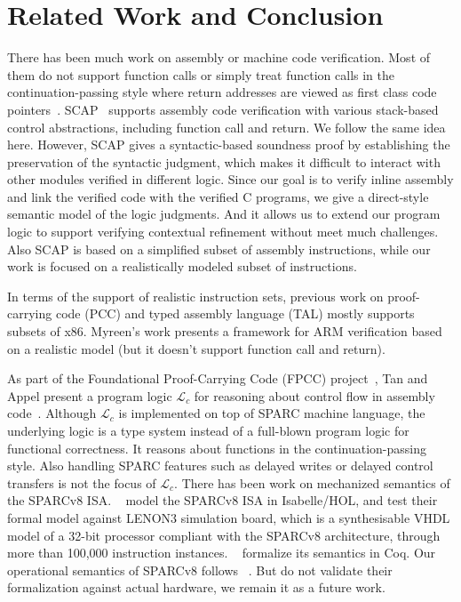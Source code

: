 \section{Related Work and Conclusion}
\label{sec:conclusion}

There has been much work on assembly or
machine code verification. Most of them
do not support function calls or simply
treat function calls in the continuation-passing
style where return addresses are viewed as first
class code pointers~\cite{PCC,FPCC,TAL,TALx86,Yu03ESOP,xcap,cflogic}.
SCAP~\cite{Feng06pldi} supports assembly code verification
with various stack-based control abstractions, including
function call and return. We follow the same idea here.
However, SCAP gives a syntactic-based soundness proof
by establishing the preservation of the syntactic judgment,
which makes it difficult to interact with other modules
verified in different logic. Since our goal is to
verify inline assembly and link the verified code
with the verified C programs, we give a direct-style
semantic model of the logic judgments. And it allows us 
to extend our program logic to support verifying 
contextual refinement without meet much challenges. 
Also SCAP
is based on a simplified subset of assembly instructions,
while our work is focused on a realistically modeled
subset of \sparc{} instructions.

In terms of the support of realistic instruction sets,
previous work on proof-carrying code (PCC) and
typed assembly language (TAL) mostly supports subsets of
x86.
Myreen's work \cite{arm-veri} presents a framework for
ARM verification based on a realistic model
(but it doesn't support function call and return).

As part of the Foundational Proof-Carrying Code (FPCC)
project~\cite{FPCC},
Tan and Appel present a program logic $\mathcal{L}_c$
for reasoning about control flow in assembly code~\cite{cflogic}.
Although $\mathcal{L}_c$ is implemented on top of SPARC machine
language, the underlying logic is a type system instead
of a full-blown program logic for functional correctness.
It reasons about functions in the continuation-passing
style. Also 
handling SPARC features such as delayed writes or delayed
control transfers is not the focus of $\mathcal{L}_c$.
There has been work on mechanized semantics of the SPARCv8 ISA.
~\cite{sparcv8-formalization-Isabelle} model the SPARCv8 ISA
in Isabelle/HOL, and test their formal model against 
LENON3 simulation board, 
which is a synthesisable VHDL model of a 32-bit processor 
compliant with the SPARCv8 architecture, 
through more than 100,000 instruction instances.   
~\cite{sparc-formalization} formalize its semantics in Coq.
Our operational semantics of SPARCv8 follows ~\cite{sparc-formalization}.
But  do not validate their formalization against actual 
hardware, we remain it as a future work. 

